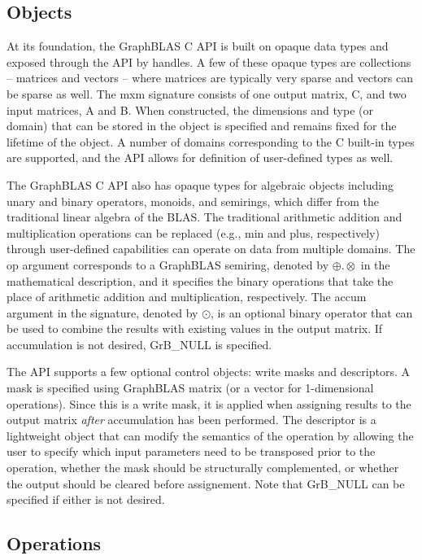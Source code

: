 \subsection{Objects}

At its foundation, the GraphBLAS C API is built on opaque data types and exposed
through the API by handles.  
A few of these opaque types are collections -- matrices and vectors --
where matrices are typically very sparse and vectors can be
sparse as well.  The mxm signature consists of one output matrix, {\sf C}, and 
two input matrices, {\sf A} and {\sf B}. When constructed, the dimensions and 
type (or domain) that can 
be stored in the object is specified and remains fixed for the lifetime of 
the object.  A number of domains corresponding to the C built-in types are
supported, and the API allows for definition of user-defined types as well.

The GraphBLAS C API also has opaque types for algebraic objects including
unary and binary operators, monoids, and semirings, which differ from the traditional
linear algebra of the BLAS.  The traditional arithmetic addition and
multiplication operations can be replaced (e.g., min and plus, respectively) through
user-defined capabilities can operate on data from multiple domains.  The {\sf op} 
argument corresponds to a GraphBLAS semiring, denoted by $\oplus.\otimes$ in the 
mathematical description, and it specifies the binary operations that take the 
place of arithmetic addition and multiplication, respectively. The {\sf accum}
argument in the signature, denoted by $\odot$, is an optional binary operator that can
be used to combine the results with existing values in the output matrix. If accumulation
is not desired, {\sf GrB\_NULL} is specified.

The API supports a few optional control objects: write masks and descriptors.  A
mask is specified using GraphBLAS matrix (or a vector for 1-dimensional operations).
Since this is a write mask, it is applied when assigning results to the output matrix
{\em after} accumulation has been performed.
The descriptor is a lightweight object that can modify the semantics of the
operation by allowing the user to specify which input parameters need to be transposed
prior to the operation, whether the mask should be structurally complemented, or whether
the output should be cleared before assignement.
Note that {\sf GrB\_NULL} can be specified if either is not desired.

\subsection{Operations}

